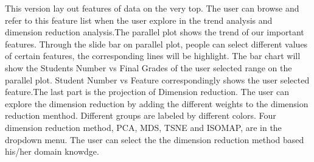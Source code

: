 \documentclass{article}
\begin{document}
This version lay out features of data on the very top. The user can browse and refer to this feature list when the user explore in the trend analysis and dimension reduction analysis.The parallel plot shows the trend of our important features. Through the slide bar on parallel plot, people can select different values of certain features, the corresponding lines will be highlight. The bar chart will show the Students Number vs Final Grades of the user selected range on the parallel plot. Student Number vs Feature correspondingly shows the user selected feature.The last part is the projection of Dimension reduction. The user can explore the dimension reduction by adding the different weights to the dimension reduction menthod. Different groups are labeled by different colors. Four dimension reduction method, PCA, MDS, TSNE and  ISOMAP, are in the dropdown menu. The user can select the the dimension reduction method based his/her domain knowdge.\\
\end{document}
